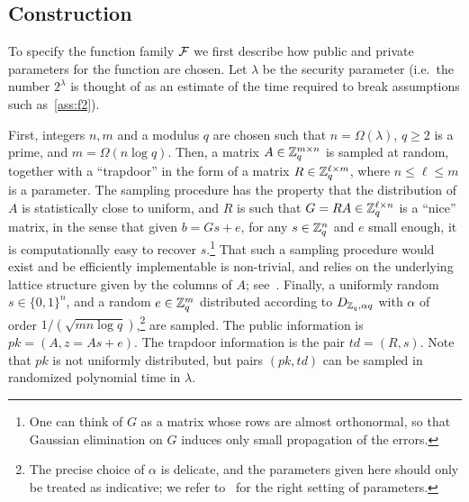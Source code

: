 \subsection{Construction}
\label{sec:lwe-construction}

To specify the function family $\mathcal{F}$ we first describe how public and private parameters for the function are chosen. Let $\lambda$ be the security parameter (i.e.\ the number $2^\lambda$ is thought of as an estimate of the time required to break assumptions such as~\ref{ass:f2}). 

First, integers $n,m$ and a modulus $q$ are chosen such that $n= \Omega(\lambda)$, $q\geq 2$ is a prime, and $m=\Omega(n\log q)$. Then, a matrix $A\in\mathbb{Z}_q^{m\times n}$ is sampled at random, together with a ``trapdoor'' in the form of a matrix $R\in \mathbb{Z}_q^{\ell\times m}$, where $n\leq \ell\leq m$ is a parameter. The sampling procedure has the property that the distribution of $A$ is statistically close to uniform, and $R$ is such that $G = RA \in \mathbb{Z}_q^{\ell\times n}$ is a ``nice'' matrix, in the sense that given $b=Gs+e$, for any $s\in\mathbb{Z}_q^n$ and $e$ small enough, it is computationally easy to recover $s$.\footnote{One can think of $G$ as a matrix whose rows are almost orthonormal, so that Gaussian elimination on $G$ induces only small propagation of the errors.} That such a sampling procedure would exist and be efficiently implementable is non-trivial, and relies on the underlying lattice structure given by the columns of $A$; see~\cite{micciancio2012trapdoors}.
Finally, a uniformly random $s\in\{0,1\}^n$, and a random $e\in \mathbb{Z}_q^m$ distributed according to $D_{\mathbb{Z}_q,\alpha q}$ with $\alpha$ of order $1/(\sqrt{mn\log q})$,\footnote{The precise choice of $\alpha$ is delicate, and the parameters given here should only be treated as indicative; we refer to~\cite[Section 8]{brakerski2018cryptographic} for the right setting of parameters.} are sampled. The public information is $pk=(A,z=As+e)$. The trapdoor information is the pair $td=(R,s)$. Note that $pk$ is not uniformly distributed, but pairs $(pk,td)$ can be sampled in randomized polynomial time in $\lambda$. 

